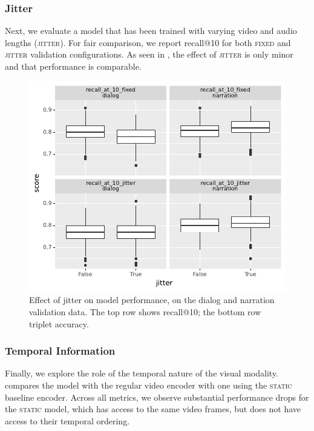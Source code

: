 \subsubsection{Jitter}
Next, we evaluate a model that has been trained with varying video and audio 
lengths (\textsc{jitter}). For fair comparison, we report recall@10 for both 
\textsc{fixed} and \textsc{jitter} validation configurations.
As seen in , the effect of \textsc{jitter} is only
minor and that performance is comparable. 
\begin{figure}[htb]
	\centering
	\includegraphics[width=\columnwidth]{results/ablations/jitter.pdf}
	\caption{Effect of jitter on model performance, on the dialog
          and narration validation data. The top row shows recall@10;
          the bottom row triplet accuracy.}
	\label{fig:jitter}
\end{figure}



\subsubsection{Temporal Information}
Finally, we explore the role of the temporal nature of the visual
modality.   compares the model with the regular video
encoder with one using the \textsc{static} baseline encoder. Across
all metrics, we observe substantial performance drops for the
\textsc{static} model, which has access to the same video frames, but
does not have access to their temporal ordering. 


